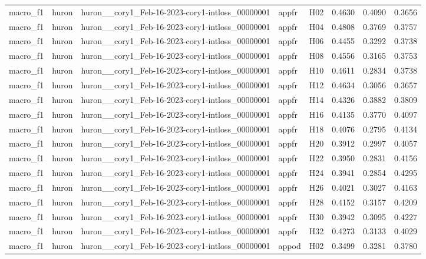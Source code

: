 \begin{table}[tbp]
\begin{tabular}{lllllrrr}
macro\_f1 & huron & huron\_\_cory1\_Feb-16-2023-cory1-intloss\_00000001 & appfr & H02 & 0.4630 & 0.4090 & 0.3656 \\
macro\_f1 & huron & huron\_\_cory1\_Feb-16-2023-cory1-intloss\_00000001 & appfr & H04 & 0.4808 & 0.3769 & 0.3757 \\
macro\_f1 & huron & huron\_\_cory1\_Feb-16-2023-cory1-intloss\_00000001 & appfr & H06 & 0.4455 & 0.3292 & 0.3738 \\
macro\_f1 & huron & huron\_\_cory1\_Feb-16-2023-cory1-intloss\_00000001 & appfr & H08 & 0.4556 & 0.3165 & 0.3753 \\
macro\_f1 & huron & huron\_\_cory1\_Feb-16-2023-cory1-intloss\_00000001 & appfr & H10 & 0.4611 & 0.2834 & 0.3738 \\
macro\_f1 & huron & huron\_\_cory1\_Feb-16-2023-cory1-intloss\_00000001 & appfr & H12 & 0.4634 & 0.3056 & 0.3657 \\
macro\_f1 & huron & huron\_\_cory1\_Feb-16-2023-cory1-intloss\_00000001 & appfr & H14 & 0.4326 & 0.3882 & 0.3809 \\
macro\_f1 & huron & huron\_\_cory1\_Feb-16-2023-cory1-intloss\_00000001 & appfr & H16 & 0.4135 & 0.3770 & 0.4097 \\
macro\_f1 & huron & huron\_\_cory1\_Feb-16-2023-cory1-intloss\_00000001 & appfr & H18 & 0.4076 & 0.2795 & 0.4134 \\
macro\_f1 & huron & huron\_\_cory1\_Feb-16-2023-cory1-intloss\_00000001 & appfr & H20 & 0.3912 & 0.2997 & 0.4057 \\
macro\_f1 & huron & huron\_\_cory1\_Feb-16-2023-cory1-intloss\_00000001 & appfr & H22 & 0.3950 & 0.2831 & 0.4156 \\
macro\_f1 & huron & huron\_\_cory1\_Feb-16-2023-cory1-intloss\_00000001 & appfr & H24 & 0.3941 & 0.2854 & 0.4295 \\
macro\_f1 & huron & huron\_\_cory1\_Feb-16-2023-cory1-intloss\_00000001 & appfr & H26 & 0.4021 & 0.3027 & 0.4163 \\
macro\_f1 & huron & huron\_\_cory1\_Feb-16-2023-cory1-intloss\_00000001 & appfr & H28 & 0.4152 & 0.3157 & 0.4209 \\
macro\_f1 & huron & huron\_\_cory1\_Feb-16-2023-cory1-intloss\_00000001 & appfr & H30 & 0.3942 & 0.3095 & 0.4227 \\
macro\_f1 & huron & huron\_\_cory1\_Feb-16-2023-cory1-intloss\_00000001 & appfr & H32 & 0.4273 & 0.3133 & 0.4029 \\
macro\_f1 & huron & huron\_\_cory1\_Feb-16-2023-cory1-intloss\_00000001 & appod & H02 & 0.3499 & 0.3281 & 0.3780 \\

\end{tabular}
\end{table}
